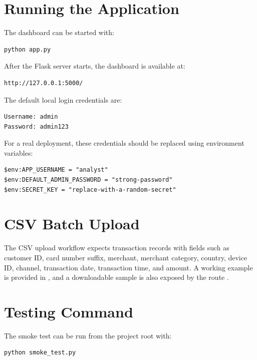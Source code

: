 \documentclass[12pt,a4paper]{report}
\begin{document}
\section{Running the Application}
The dashboard can be started with:
\begin{verbatim}
python app.py
\end{verbatim}
After the Flask server starts, the dashboard is available at:
\begin{verbatim}
http://127.0.0.1:5000/
\end{verbatim}

The default local login credentials are:
\begin{verbatim}
Username: admin
Password: admin123
\end{verbatim}

For a real deployment, these credentials should be replaced using environment variables:
\begin{verbatim}
$env:APP_USERNAME = "analyst"
$env:DEFAULT_ADMIN_PASSWORD = "strong-password"
$env:SECRET_KEY = "replace-with-a-random-secret"
\end{verbatim}

\section{CSV Batch Upload}
The CSV upload workflow expects transaction records with fields such as customer ID, card number suffix, merchant, merchant category, country, device ID, channel, transaction date, transaction time, and amount. A working example is provided in , and a downloadable sample is also exposed by the route .

\section{Testing Command}
The smoke test can be run from the project root with:
\begin{verbatim}
python smoke_test.py
\end{verbatim}

\renewcommand{\bibname}{References}


\end{document}
